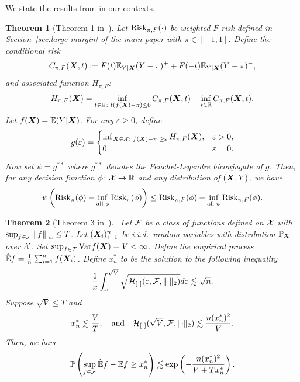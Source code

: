 \documentclass[11pt]{article}
\theoremstyle{plain}
\newtheorem{thm}{Theorem}[section]
\theoremstyle{definition}
\def\risk{\textup{Risk}_\pi}
\def\riskF{\textup{Risk}_{\pi,F}}
\begin{document}
We state the results from \citet[Theorem 1]{scott2011surrogate} in our contexts. 
\begin{thm}[Theorem 1 in~\cite{scott2011surrogate}]\label{thm:scott} Let $\riskF(\cdot)$ be weighted $F$-risk defined in Section~\ref{sec:large-margin} of the main paper with $\pi\in[-1,1]$. Define the conditional risk 
\[
C_{\pi,F}(\bm X,t):=F(t)\mathbb{E}_{Y|\bm X}(Y-\pi)^{+}+F(-t)\mathbb{E}_{Y|\bm X}(Y-\pi)^{-},
\]
and associated function $H_{\pi,F}$:
\[
H_{\pi,F}(\bm X)=\inf_{t\in\mathbb{R}\colon t(f(\bm X)-\pi)\leq 0}C_{\pi,F}(\bm X, t)-\inf_{t\in\mathbb{R}} C_{\pi,F}(\bm X, t).
\]
Let $f(\bm X)=\mathbb{E}(Y|\bm X)$. For any $\varepsilon\geq 0$, define
\[
g(\varepsilon)=\begin{cases}
\inf_{\bm X\in\mathcal{X}:|f(\bm X)-\pi|\geq \varepsilon} H_{\pi,F}(\bm X),& \varepsilon>0,\\
0& \varepsilon=0.
\end{cases}
\]
Now set $\psi=g^{**}$ where $g^{**}$ denotes the Fenchel-Legendre biconjugate of $g$. Then, for any decision function $\phi\colon \mathcal{X}\to \mathbb{R}$ and any distribution of $(\bm X,Y)$, we have
\[
\psi\left( \risk(\phi)-\inf_{\text{all }\phi}\risk(\phi)\right)\leq \riskF(\phi)-\inf_{\text{all }\psi}\riskF(\phi).
\]
\end{thm}
\begin{thm}[Theorem 3 in~\cite{shen1994convergence}]~\label{thm:refer}Let $\mathcal{F}$ be a class of functions defined on $\mathcal{X}$ with $\sup_{f\in\mathcal{F}}\left\lVert f\right\rVert_{\infty}\leq T$. Let $(\bm X_i)_{i=1}^n$ be i.i.d.\ random variables with distribution $\mathbb{P}_{\bm X}$ over $\mathcal{X}$. Set $\sup_{f\in\mathcal{F}}\textup{Var}f(\bm X)=V<\infty$. 
Define the empirical process $\mathbb{\hat E}f={1\over n}\sum_{i=1}^n f(\bm X_i)$. 
Define $x_n^*$ to be the solution to the following inequality
\[
{1\over x}\int_x^{\sqrt{V}}\sqrt{\tH_{[\ ]}(\varepsilon,\tF,\vnormSize{}{\cdot})}d\varepsilon \lesssim \sqrt{n}.
\]
Suppose $\sqrt{V}\leq T$ and 
\[
x_n^*\lesssim {V\over T},\quad \text{and}\quad \mathcal{H}_{[\ ]}(\sqrt{V},\mathcal{F},\lVert\cdot\rVert_2)\lesssim {n(x_n^*)^2 \over V}.
\]
Then, we have
\begin{equation}\label{eq:oneside}
\mathbb{P}\left(\sup_{f\in\mathcal{F}}\mathbb{\hat E}f -\mathbb{E}f\geq x^*_n\right)\lesssim  \exp\left(-{n (x^*_n)^2\over V+Tx^*_n}\right). 
\end{equation}
\end{thm}

 
\end{document}
